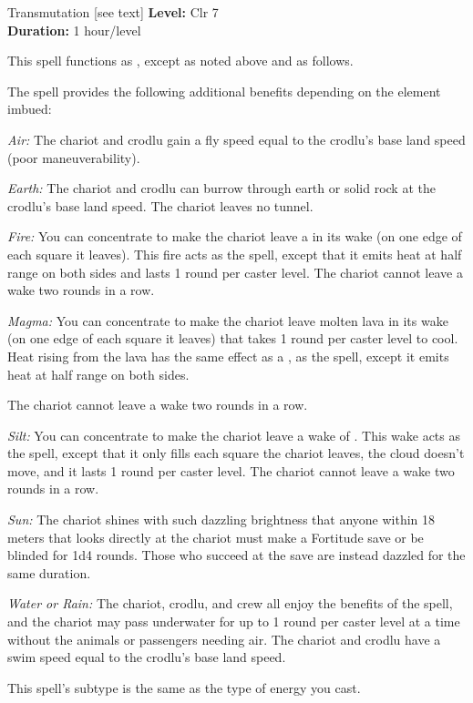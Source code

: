 {Transmutation [see text]}
{
	\textbf{Level:}
	Clr 7\\
	\textbf{Duration:}
	1 hour/level\\
}
{

	This spell functions as , except as noted above and as follows.

	The spell provides the following additional benefits depending on the element imbued:
	\begin{itemize*}
	\item \textit{Air:} The chariot and crodlu gain a fly speed equal to the crodlu's base land speed (poor maneuverability).
	\item \textit{Earth:} The chariot and crodlu can burrow through earth or solid rock at the crodlu's base land speed. The chariot leaves no tunnel.
	\item \textit{Fire:} You can concentrate to make the chariot leave a  in its wake (on one edge of each square it leaves). This fire acts as the spell, except that it emits heat at half range on both sides and lasts 1 round per caster level. The chariot cannot leave a wake two rounds in a row.
	\item \textit{Magma:} You can concentrate to make the chariot leave molten lava in its wake (on one edge of each square it leaves) that takes 1 round per caster level to cool. Heat rising from the lava has the same effect as a , as the spell, except it emits heat at half range on both sides.
	\item The chariot cannot leave a wake two rounds in a row.
	\item \textit{Silt:} You can concentrate to make the chariot leave a wake of . This wake acts as the spell, except that it only fills each square the chariot leaves, the cloud doesn't move, and it lasts 1 round per caster level. The chariot cannot leave a wake two rounds in a row.
	\item \textit{Sun:} The chariot shines with such dazzling brightness that anyone within 18 meters that looks directly at the chariot must make a Fortitude save or be blinded for 1d4 rounds. Those who succeed at the save are instead dazzled for the same duration.
	\item \textit{Water or Rain:} The chariot, crodlu, and crew all enjoy the benefits of the  spell, and the chariot may pass underwater for up to 1 round per caster level at a time without the animals or passengers needing air. The chariot and crodlu have a swim speed equal to the crodlu's base land speed.
	\end{itemize*}

	This spell's subtype is the same as the type of energy you cast.
}
